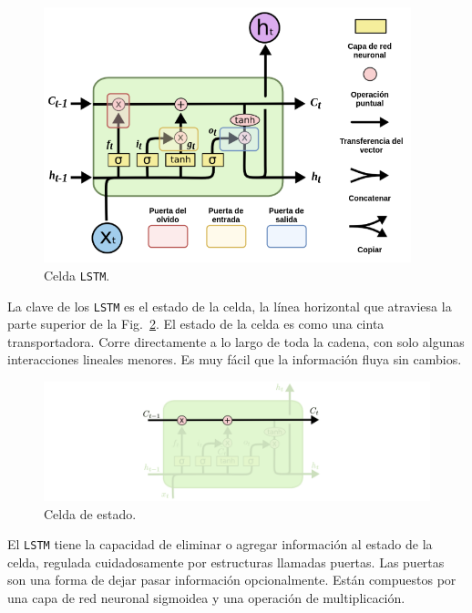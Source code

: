 \documentclass[a4paper,12pt]{article}
\begin{document}
\begin{figure}[H]
	\begin{center}				
		\includegraphics[width=0.95\textwidth]{lstmcell5.png}
		\caption{Celda \texttt{LSTM}.}
		\label{fig:lstmcell}
	\end{center}
\end{figure}

La clave de los \texttt{LSTM} es el estado de la celda, la línea horizontal que atraviesa la parte superior de la Fig.~\ref{fig:lstm1}. El estado de la celda es como una cinta transportadora. Corre directamente a lo largo de toda la cadena, con solo algunas interacciones lineales menores. Es muy fácil que la información fluya sin cambios.

\begin{figure}[H]
	\begin{center}				
		\includegraphics[width=1\textwidth]{lstm1.png}
		\caption{Celda de estado. \citep{olahlstm}}
		\label{fig:lstm1}
	\end{center}
\end{figure}

El \texttt{LSTM} tiene la capacidad de eliminar o agregar información al estado de la celda, regulada cuidadosamente por estructuras llamadas puertas. Las puertas son una forma de dejar pasar información opcionalmente. Están compuestos por una capa de red neuronal sigmoidea y una operación de multiplicación.
\end{document}
